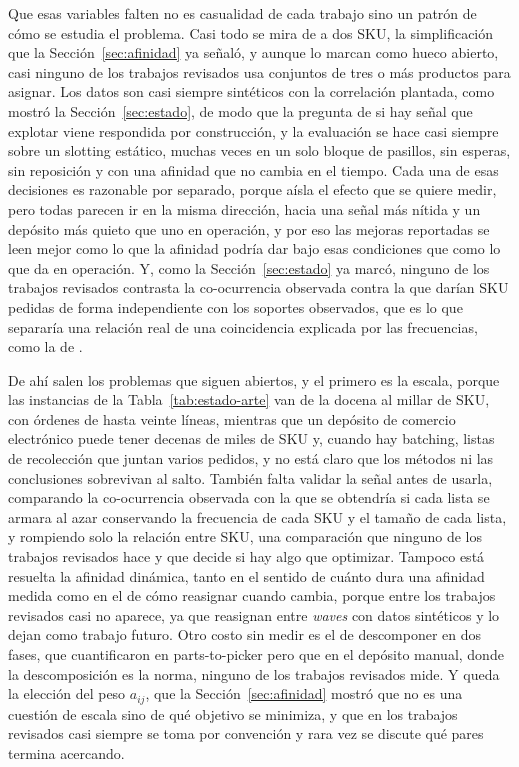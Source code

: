 Que esas variables falten no es casualidad de cada trabajo sino un patrón de cómo se estudia el problema.
Casi todo se mira de a dos SKU, la simplificación que la Sección~\ref{sec:afinidad} ya señaló, y aunque \citet{islam2023cslap} lo marcan como hueco abierto, casi ninguno de los trabajos revisados usa conjuntos de tres o más productos para asignar.
Los datos son casi siempre sintéticos con la correlación plantada, como mostró la Sección~\ref{sec:estado}, de modo que la pregunta de si hay señal que explotar viene respondida por construcción, y la evaluación se hace casi siempre sobre un slotting estático, muchas veces en un solo bloque de pasillos, sin esperas, sin reposición y con una afinidad que no cambia en el tiempo.
Cada una de esas decisiones es razonable por separado, porque aísla el efecto que se quiere medir, pero todas parecen ir en la misma dirección, hacia una señal más nítida y un depósito más quieto que uno en operación, y por eso las mejoras reportadas se leen mejor como lo que la afinidad podría dar bajo esas condiciones que como lo que da en operación.
Y, como la Sección~\ref{sec:estado} ya marcó, ninguno de los trabajos revisados contrasta la co-ocurrencia observada contra la que darían SKU pedidas de forma independiente con los soportes observados, que es lo que separaría una relación real de una coincidencia explicada por las frecuencias, como la de \citet{zhang2016correlated}.

De ahí salen los problemas que siguen abiertos, y el primero es la escala, porque las instancias de la Tabla~\ref{tab:estado-arte} van de la docena al millar de SKU, con órdenes de hasta veinte líneas, mientras que un depósito de comercio electrónico puede tener decenas de miles de SKU y, cuando hay batching, listas de recolección que juntan varios pedidos, y no está claro que los métodos ni las conclusiones sobrevivan al salto.
También falta validar la señal antes de usarla, comparando la co-ocurrencia observada con la que se obtendría si cada lista se armara al azar conservando la frecuencia de cada SKU y el tamaño de cada lista, y rompiendo solo la relación entre SKU, una comparación que ninguno de los trabajos revisados hace y que decide si hay algo que optimizar.
Tampoco está resuelta la afinidad dinámica, tanto en el sentido de cuánto dura una afinidad medida como en el de cómo reasignar cuando cambia, porque entre los trabajos revisados casi no aparece, ya que \citet{xu2020dynamic} reasignan entre \emph{waves} con datos sintéticos y \citet{mirzaei2021integrated} lo dejan como trabajo futuro.
Otro costo sin medir es el de descomponer en dos fases, que \citet{mirzaei2021integrated} cuantificaron en parts-to-picker pero que en el depósito manual, donde la descomposición es la norma, ninguno de los trabajos revisados mide.
Y queda la elección del peso $a_{ij}$, que la Sección~\ref{sec:afinidad} mostró que no es una cuestión de escala sino de qué objetivo se minimiza, y que en los trabajos revisados casi siempre se toma por convención y rara vez se discute qué pares termina acercando.

